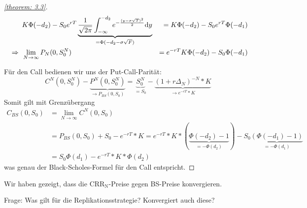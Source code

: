 \begin{proof}[\cref{theorem: 3.3}]
	\begin{alignat*}{2}
		&K \Phi(-d_2) - S_0 e^{rT} \underbrace{\frac{1}{\sqrt{2 \pi}} \int_{-\infty}^{-d_2} e^{-\frac{(y-\sigma \sqrt{T})^2}{2}} \mathrm{d}{y}}_{= \Phi(-d_2 - \sigma \sqrt{F})}
		&= K \Phi(-d_2) - S_0 e^{rT} \Phi(-d_1) \\
		\enskip \Rightarrow \enskip &\lim_{N \to \infty} P_N(0,S_0^N) &= e^{-rT} K \Phi(-d_2) - S_0 \Phi(-d_1)
	\end{alignat*}
	
	Für den Call bedienen wir uns der Put-Call-Parität: 
	\begin{equation*}
		C^N(0,S_0^N) - \underbrace{P^N(0,S_0^N)}_{\to P_{BS}(0,S_0)} = \underbrace{S_0^N}_{=S_0} - \underbrace{(1+ r \Delta_N)^{-N} * K}_{\to e^{-cT} * K}
	\end{equation*}
	Somit gilt mit Grenzübergang
	\begin{align*}
		C_{BS}(0,S_0) &= \lim_{N \to \infty} C^N(0,S_0) \\
		&= P_{BS}(0,S_0) + S_0 - e^{-rT} * K = e^{-rT} * K * (\underbrace{\Phi(-d_2) - 1}_{= - \Phi(d_2)}) - S_0 \underbrace{(\Phi(-d_1) - 1)}_{= - \Phi(d_1)} \\
		&= S_0 \Phi(d_1) - e^{-rT} * K * \Phi(d_2)
	\end{align*}
	was genau der Black-Scholes-Formel für den Call entspricht.
\end{proof}

Wir haben gezeigt, dass die $\text{CRR}_\text{N}$-Preise gegen BS-Preise konvergieren.

Frage: Was gilt für die Replikationsstrategie? Konvergiert auch diese?

